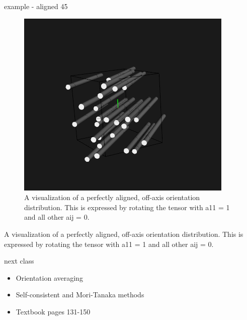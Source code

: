 \documentclass[
  letterpaper,
  ignorenonframetext,
  aspectratio=43,
  handout,
  12pt]{beamer}
\providecommand{\tightlist}{%
  \setlength{\itemsep}{0pt}\setlength{\parskip}{0pt}}
\providecommand{\tightlist}{%
\setlength{\itemsep}{0pt}\setlength{\parskip}{0pt}}
\let\Oldincludegraphics\includegraphics
\renewcommand{\includegraphics}[2][]{\Oldincludegraphics[width=\textwidth,height=0.7\textheight,keepaspectratio]{#2}}
\begin{document}
\begin{frame}{example - aligned 45}
\protect\hypertarget{example---aligned-45}{}
\begin{figure}
\centering
\includegraphics{../images/aligned45.PNG}
\caption{A visualization of a perfectly aligned, off-axis orientation
distribution. This is expressed by rotating the tensor with a11 = 1 and
all other aij = 0.}
\end{figure}

A visualization of a perfectly aligned, off-axis orientation
distribution. This is expressed by rotating the tensor with a11 = 1 and
all other aij = 0.
\end{frame}

\begin{frame}{next class}
\protect\hypertarget{next-class}{}
\begin{itemize}
\tightlist
\item
  Orientation averaging
\item
  Self-consistent and Mori-Tanaka methods
\item
  Textbook pages 131-150
\end{itemize}
\end{frame}
\end{document}

